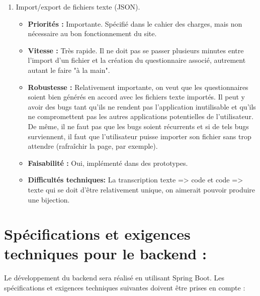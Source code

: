 \documentclass{article}
\begin{document}
\begin{enumerate}[noitemsep]
\begin{itemize}[noitemsep]
\end{itemize}
\item Import/export de fichiers texte (JSON).
\begin{itemize}[noitemsep]
    \item \textbf{Priorités : }Importante. Spécifié dans le cahier des charges, mais non nécessaire au bon fonctionnement du site.
    \item \textbf{Vitesse : }Très rapide. Il ne doit pas se passer plusieurs minutes entre l'import d'un fichier et la création du questionnaire associé, autrement autant le faire "à la main".
    \item \textbf{Robustesse : }Relativement importante, on veut que les questionnaires soient bien générés en accord avec les fichiers texte importés. Il peut y avoir des bugs tant qu'ils ne rendent pas l'application inutilisable et qu'ils ne compromettent pas les autres applications potentielles de l'utilisateur. De même, il ne faut pas que les bugs soient récurrents et si de tels bugs surviennent, il faut que l'utilisateur puisse importer son fichier sans trop attendre (rafraîchir la page, par exemple).
    \item \textbf{Faisabilité : }Oui, implémenté dans des prototypes.
    \item \textbf{Difficultés techniques: } La transcription texte => code et code => texte qui se doit d'être relativement unique, on aimerait pouvoir produire une bijection.
\end{itemize}
\end{enumerate}


\section{Spécifications et exigences techniques pour le backend :}

Le développement du backend sera réalisé en utilisant Spring Boot. Les spécifications et exigences techniques suivantes doivent être prises en compte :
\end{document}
